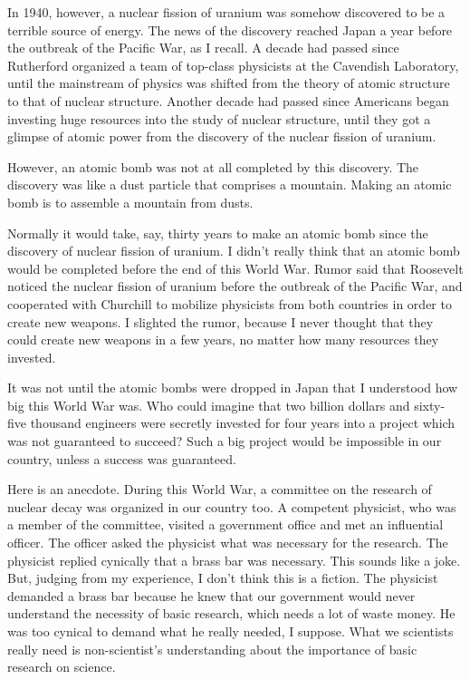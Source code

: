 \documentclass[11pt,a4j,twocolumn]{jarticle}
\begin{document}
In 1940, however, a nuclear fission of uranium was somehow discovered to
be a terrible source of energy.
The news of the discovery reached Japan 
a year before the outbreak of the Pacific War, as I recall.
A decade had passed since Rutherford organized a team of
top-class physicists at the Cavendish Laboratory,
until the mainstream of physics was shifted from the theory of atomic structure
to that of nuclear structure.
Another decade had passed since Americans began investing huge resources
into the study of nuclear structure, until they got a glimpse of atomic power
from the discovery of the nuclear fission of uranium.

However, an atomic bomb was not at all completed by this discovery.
The discovery was like a dust particle that comprises a mountain.
Making an atomic bomb is to assemble a mountain from dusts.

Normally it would take, say, thirty years
to make an atomic bomb since the discovery of nuclear fission of uranium.
I didn't really think that an atomic bomb would be completed before the end of this World War.
Rumor said that Roosevelt noticed the nuclear fission of uranium
before the outbreak of the Pacific War, and cooperated with Churchill
to mobilize physicists from both countries in order to create new weapons.
I slighted the rumor, because I never thought that they could create new weapons
in a few years, no matter how many resources they invested.

It was not until the atomic bombs were dropped in Japan that I understood how big this World War was.
Who could imagine that two billion dollars and sixty-five thousand engineers were secretly
invested for four years into a project which was not guaranteed to succeed?
Such a big project would be impossible in our country, unless a success was guaranteed.

Here is an anecdote. During this World War,
a committee on the research of nuclear decay was organized in our country too.
A competent physicist, who was a member of the committee,
visited a government office and met an influential officer.
The officer asked the physicist what was necessary for the research.
The physicist replied cynically that a brass bar was necessary.
This sounds like a joke. But, judging from my experience, I don't think this is a fiction.
The physicist demanded a brass bar because he knew that
our government would never understand the necessity of basic research,
which needs a lot of waste money. 
He was too cynical to demand what he really needed, I suppose.
What we scientists really need is non-scientist's understanding
about the importance of basic research on science.
\end{document}
